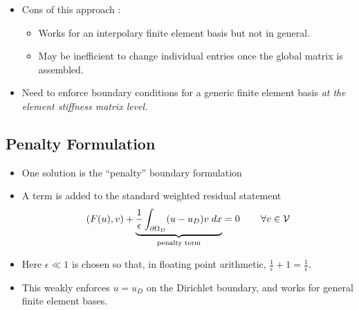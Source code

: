 \begin{frame}[c]
  \begin{itemize}[<+->]
    \item {Cons of this approach :
      \begin{itemize}[<+->]
      \item {Works for an interpolary finite element basis
	but not in general.}
	
      \item {May be inefficient to change individual entries once the global matrix is assembled.}
      \end{itemize}
      }
    \item {Need to enforce boundary conditions for
      a generic finite element basis \emph{at the element stiffness matrix level}.}

  \end{itemize}
\end{frame}


\subsection*{Penalty Formulation}
\begin{frame}[c]
  \begin{itemize}[<+->]
  \item {One solution is the ``penalty'' boundary formulation}
  \item {A term is added to the standard weighted residual statement
    \begin{equation}
      \nonumber
      (F( u ), v)
      + \underbrace{\frac{1}{\epsilon} \int_{\partial \Omega_D} (u-u_D)v \; dx}_{\text{penalty term}} =
      0 \hspace{.3in} \forall v \in \mathcal{V}
    \end{equation}
  }
  \item {Here $\epsilon \ll 1$ is chosen so that, in floating point arithmetic,
    $\frac{1}{\epsilon} + 1 = \frac{1}{\epsilon}$.}
  \item {This weakly enforces $u=u_D$ on the Dirichlet boundary, and works for
    general finite element bases.}

  \end{itemize}
\end{frame}



